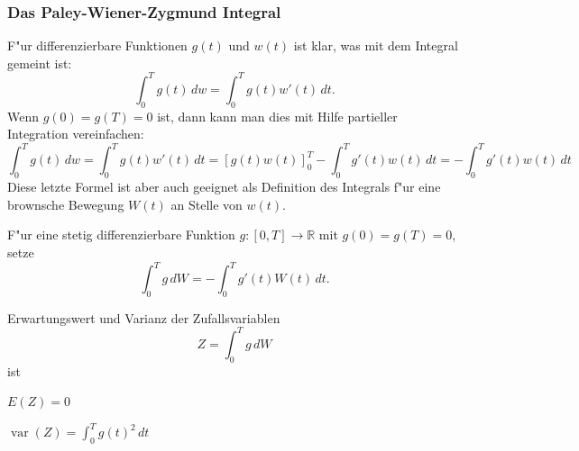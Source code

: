 \subsubsection{Das Paley-Wiener-Zygmund Integral}
F"ur differenzierbare Funktionen $g(t)$ und $w(t)$ ist klar, was 
mit dem Integral gemeint ist:
\[
\int_0^T g(t)\,dw = \int_0^T g(t) w'(t)\,dt.
\]
Wenn $g(0)=g(T)=0$ ist, dann kann man dies mit Hilfe partieller Integration
vereinfachen:
\[
\int_0^T g(t)\,dw
=
\int_0^T g(t) w'(t)\,dt
=
[g(t)w(t)]_0^T
-
\int_0^T g'(t) w(t)\,dt
=
-\int_0^T g'(t) w(t)\,dt
\]
Diese letzte Formel ist aber auch geeignet als Definition des Integrals
f"ur eine brownsche Bewegung $W(t)$ an Stelle von $w(t)$.

\begin{definition}
F"ur eine stetig differenzierbare Funktion $g\colon[0,T]\to \mathbb R$ 
mit $g(0)=g(T)=0$, setze
\[
\int_0^T g\,dW = -\int_0^T g'(t) W(t)\,dt.
\]
\end{definition}

\begin{hilfssatz}
Erwartungswert und Varianz der Zufallsvariablen
\[
Z=\int_0^T g\,dW
\]
ist
\begin{compactenum}
\item $E(Z)=0$
\item $\operatorname{var}(Z)=\int_0^Tg(t)^2\,dt$
\end{compactenum}
\end{hilfssatz}

